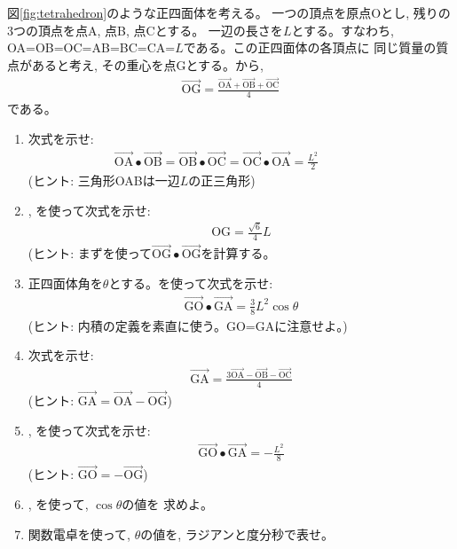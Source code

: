 \begin{q}\label{q:vect_tetrahedron} 図\ref{fig:tetrahedron}のような正四面体を考える。
一つの頂点を原点Oとし, 残りの3つの頂点を点A, 点B, 点Cとする。
一辺の長さを$L$とする。すなわち, OA=OB=OC=AB=BC=CA=$L$である。この正四面体の各頂点に
同じ質量の質点があると考え, その重心を点Gとする。から, 
\begin{eqnarray}
\overrightarrow{\text{OG}}=\frac{\overrightarrow{\text{OA}}+\overrightarrow{\text{OB}}+\overrightarrow{\text{OC}}}{4}\label{eq:vect_tetrahedron02}
\end{eqnarray}
である。
\begin{enumerate} 
\item 次式を示せ:
\begin{eqnarray}
\overrightarrow{\text{OA}}\bullet\overrightarrow{\text{OB}}=\overrightarrow{\text{OB}}\bullet\overrightarrow{\text{OC}}=\overrightarrow{\text{OC}}\bullet\overrightarrow{\text{OA}}=\frac{L^2}{2}\quad\quad\quad\quad
\label{eq:vect_tetrahedron04}
\end{eqnarray}
(ヒント: 三角形OABは一辺$L$の正三角形)
\item {}, を使って次式を示せ:
\begin{eqnarray}
\text{OG}=\frac{\sqrt{6}}{4}L\label{eq:vect_tetrahedron06}
\end{eqnarray}
(ヒント: まずを使って$\overrightarrow{\text{OG}}\bullet\overrightarrow{\text{OG}}$を計算する。
\item 正四面体角を$\theta$とする。を使って次式を示せ:
\begin{eqnarray}
\overrightarrow{\text{GO}}\bullet\overrightarrow{\text{GA}}=\frac{3}{8}L^2\cos\theta\label{eq:vect_tetrahedron08}
\end{eqnarray}
(ヒント: 内積の定義を素直に使う。GO=GAに注意せよ。)
\item 次式を示せ:
\begin{eqnarray}
\overrightarrow{\text{GA}}=\frac{3\overrightarrow{\text{OA}}-\overrightarrow{\text{OB}}-\overrightarrow{\text{OC}}}{4}\label{eq:vect_tetrahedron10}
\end{eqnarray}
(ヒント: $\overrightarrow{\text{GA}}=\overrightarrow{\text{OA}}-\overrightarrow{\text{OG}}$)
\item {}, を使って次式を示せ:
\begin{eqnarray}
\overrightarrow{\text{GO}}\bullet\overrightarrow{\text{GA}}=-\frac{L^2}{8}\label{eq:vect_tetrahedron12}
\end{eqnarray}
(ヒント: $\overrightarrow{\text{GO}}=-\overrightarrow{\text{OG}}$)
\item {}, を使って, $\cos\theta$の値を
求めよ。
\item 関数電卓を使って, $\theta$の値を, ラジアンと度分秒で表せ。
\end{enumerate}\end{q}
